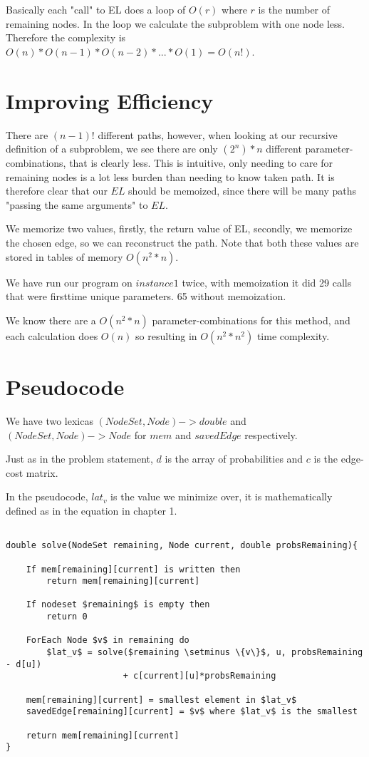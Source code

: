 \documentclass[a4paper,11pt]{article}
\begin{document}
Basically each "call" to EL does a loop of $O(r)$ where
$r$ is the number of remaining nodes. In the loop
we calculate the subproblem with one node less.
Therefore the complexity is $O(n)*O(n-1)*O(n-2)*...*O(1) = O(n!)$.



\section{Improving Efficiency}

There are $(n-1)!$ different paths, however, when looking at our
recursive definition of a subproblem, we see there are only
$(2^n)*n$ different parameter-combinations, that is clearly less. This
is intuitive, only needing to care for remaining
nodes is a lot less burden than needing to know taken path.
It is therefore clear that our $EL$ should be memoized, since there
will be many paths "passing the same arguments" to $EL$.

We memorize two values, firstly, the return value of EL, secondly,
we memorize the chosen edge, so we can reconstruct the path.
Note that both these values are stored in tables of memory $O(n^2*n)$.

We have run our program on $instance 1$ twice, with memoization
it did 29 calls that were firsttime unique parameters.
65 without memoization.

We know there are a $O(n^2*n)$ parameter-combinations for this method,
and each calculation does $O(n)$ so resulting in $O(n^2*n^2)$
time complexity.


\section{Pseudocode}
We have two lexicas $(NodeSet, Node) -> double$ and $(NodeSet, Node) -> Node$
for $mem$ and $savedEdge$ respectively.

Just as in the problem statement, $d$ is the array of probabilities
and $c$ is the edge-cost matrix.

In the pseudocode, $lat_v$ is the value we minimize over,
it is mathematically defined as in the equation in chapter 1.

\begin{lstlisting}[mathescape]

double solve(NodeSet remaining, Node current, double probsRemaining){

    If mem[remaining][current] is written then
        return mem[remaining][current]

    If nodeset $remaining$ is empty then
        return 0

    ForEach Node $v$ in remaining do
        $lat_v$ = solve($remaining \setminus \{v\}$, u, probsRemaining - d[u])
                       + c[current][u]*probsRemaining

    mem[remaining][current] = smallest element in $lat_v$
    savedEdge[remaining][current] = $v$ where $lat_v$ is the smallest

    return mem[remaining][current]
}

\end{lstlisting}
\end{document}
